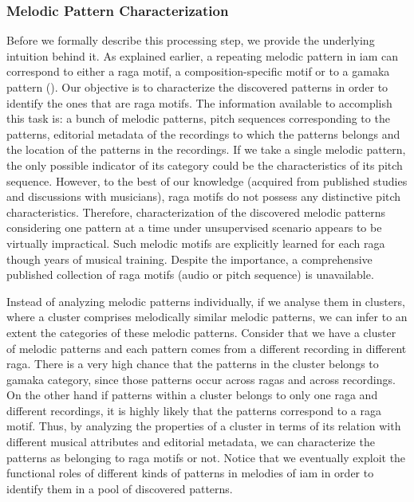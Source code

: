 {\subsubsection{Melodic Pattern Characterization}
\label{pattern_characterization}

Before we formally describe this processing step, we provide the underlying intuition behind it. As explained earlier, a repeating melodic pattern in \gls{iam} can correspond to either a \gls{raga} motif, a composition-specific motif or to a \gls{gamaka} pattern (). Our objective is to characterize the discovered patterns in order to identify the ones that are \gls{raga} motifs. The information available to accomplish this task is: a bunch of melodic patterns, pitch sequences corresponding to the patterns, editorial metadata of the recordings to which the patterns belongs and the location of the patterns in the recordings. If we take a single melodic pattern, the only possible indicator of its category could be the characteristics of its pitch sequence. However, to the best of our knowledge (acquired from published studies and discussions with musicians), \gls{raga} motifs do not possess any distinctive pitch characteristics. Therefore, characterization of the discovered melodic patterns considering one pattern at a time under unsupervised scenario appears to be virtually impractical. Such melodic motifs are explicitly learned for each \gls{raga} though years of musical training. Despite the importance, a comprehensive published collection of \gls{raga} motifs (audio or pitch sequence) is unavailable. 

Instead of analyzing melodic patterns individually, if we analyse them in clusters, where a cluster comprises melodically similar melodic patterns, we can infer to an extent the categories of these melodic patterns. Consider that we have a cluster of melodic patterns and each pattern comes from a different recording in different \gls{raga}. There is a very high chance that the patterns in the cluster belongs to \gls{gamaka} category, since those patterns occur across \glspl{raga} and across recordings. On the other hand if patterns within a cluster belongs to only one \gls{raga} and different recordings, it is highly likely that the patterns correspond to a \gls{raga} motif. Thus, by analyzing the properties of a cluster in terms of its relation with different musical attributes and editorial metadata, we can characterize the patterns as belonging to \gls{raga} motifs or not. Notice that we eventually exploit the functional roles of different kinds of patterns in melodies of \gls{iam} in order to identify them in a pool of discovered patterns. 

}
